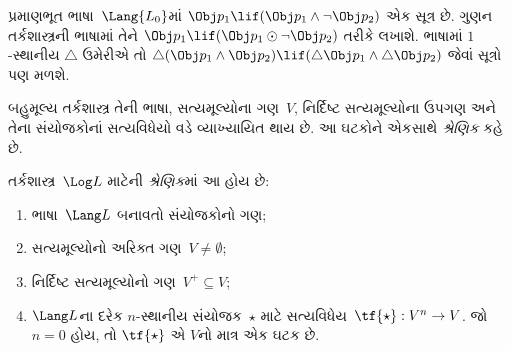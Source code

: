 \begin{ex}
  પ્રમાણભૂત ભાષા~$\Lang{L_0}$માં $\Obj p_1 \lif (\Obj p_1
  \land \lnot \Obj p_2)$ એક સૂત્ર છે. ગુણન
  તર્કશાસ્ત્રની ભાષામાં તેને $\Obj p_1 \lif (\Obj p_1 \odot
  \lnot \Obj p_2)$ તરીકે લખાશે. ભાષામાં $1$-સ્થાનીય
  $\triangle$ ઉમેરીએ તો $\triangle (\Obj p_1
  \land \Obj p_2) \lif (\triangle \Obj p_1 \land \triangle \Obj p_2)$
  જેવાં સૂત્રો પણ મળશે.
\end{ex}
\endgroup


\begingroup
\makeatletter{}\makeatother


\label{guunit:OLP-0388}


બહુમૂલ્ય તર્કશાસ્ત્ર તેની ભાષા, સત્યમૂલ્યોના ગણ~$V$,
નિર્દિષ્ટ સત્યમૂલ્યોના ઉપગણ અને તેના સંયોજકોનાં
સત્યવિધેયો વડે વ્યાખ્યાયિત થાય છે. આ ઘટકોને
એકસાથે \emph{શ્રેણિક} કહે છે.

\begin{defn}[શ્રેણિક]
તર્કશાસ્ત્ર~$\Log L$ માટેની \emph{શ્રેણિક}માં આ હોય છે:
\begin{enumerate}
\item ભાષા~$\Lang L$ બનાવતો સંયોજકોનો ગણ;
\item સત્યમૂલ્યોનો અરિક્ત ગણ~$V \neq \emptyset$;
\item નિર્દિષ્ટ સત્યમૂલ્યોનો ગણ~$V^+ \subseteq V$;
\item $\Lang L$ના દરેક $n$-સ્થાનીય સંયોજક~$\star$
માટે સત્યવિધેય~$\tf{\star} : V^n \to V$. જો
$n = 0$ હોય, તો $\tf{\star}$ એ $V$નો માત્ર એક ઘટક છે.
\end{enumerate}
\end{defn}

